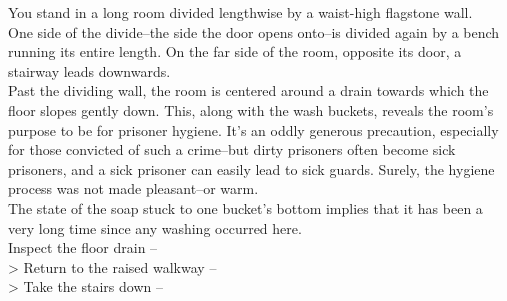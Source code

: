 You stand in a long room divided lengthwise by a waist-high flagstone wall.\\

One side of the divide--the side the door opens onto--is divided again by a bench running its entire length. On the far side of the room, opposite its door, a stairway leads downwards.\\

Past the dividing wall, the room is centered around a drain towards which the floor slopes gently down. This, along with the wash buckets, reveals the room’s purpose to be for prisoner hygiene. It’s an oddly generous precaution, especially for those convicted of such a crime--but dirty prisoners often become sick prisoners, and a sick prisoner can easily lead to sick guards. Surely, the hygiene process was not made pleasant--or warm.\\

The state of the soap stuck to one bucket’s bottom implies that it has been a very long time since any washing occurred here.\\

 Inspect the floor drain -- \\
> Return to the raised walkway -- \\
> Take the stairs down -- 